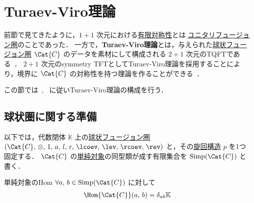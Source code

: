 \documentclass[TQFT_main]{subfiles}
\begin{document}
\section{Turaev-Viro理論}

前節で見てきたように，$1+1$ 次元における\hyperref[ax:symcat-2d-0form]{有限対称性}とは \hyperref[def:tensorfusion-cat]{ユニタリフュージョン圏}のことであった．
一方で，\textbf{Turaev-Viro理論}とは，与えられた\hyperref[def:spherical]{球状フュージョン圏} $\Cat{C}$ のデータを素材にして構成される $2+1$ 次元のTQFTである~\cite{TuraevViro1992TQFT}．
$2+1$ 次元のsymmetry TFTとしてTuraev-Viro理論を採用することにより，境界に $\Cat{C}$ の対称性を持つ理論を作ることができる~\cite{AFM2020}．

この節では~\cite{Bakalov2001lectures}, ~\cite{KirillovBalsam2010TVBW}に従いTuraev-Viro理論の構成を行う．

\subsection{球状圏に関する準備}

以下では，代数閉体 $\mathbb{K}$ 上の\hyperref[def:spherical]{球状フュージョン圏} $(\Cat{C},\, \otimes,\, 1,\, a,\, l,\, r,\, \lcoev,\, \lev,\, \rcoev,\, \rev)$ と，その\hyperref[def:pivotal]{旋回構造} $p$ を1つ固定する．
$\Cat{C}$ の\hyperref[def:semisimple-cat]{単純対象}の同型類が成す有限集合を $\mathrm{Simp}(\Cat{C})$ と書く．

\begin{mylem}[label=lem:simple-hom,breakable]{単純対象のHom}
    $\forall a,\, b \in \mathrm{Simp}(\Cat{C})$ に対して
    \begin{align}
        \Hom{\Cat{C}} (a,\, b) = \delta_{ab} \mathbb{K}
    \end{align}
\end{mylem}
\end{document}
